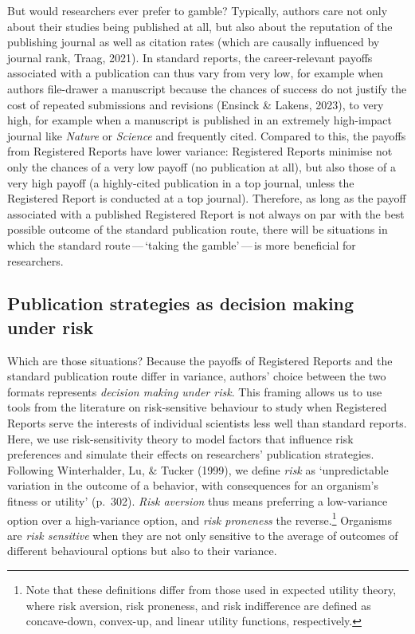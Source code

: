\documentclass[
  ,man,mask,floatsintext]{apa6}
\begin{document}
But would researchers ever prefer to gamble?
Typically, authors care not only about their studies being published at all, but also about the reputation of the publishing journal as well as citation rates (which are causally influenced by journal rank, Traag, 2021).
In standard reports, the career-relevant payoffs associated with a publication can thus vary from very low, for example when authors file-drawer a manuscript because the chances of success do not justify the cost of repeated submissions and revisions (Ensinck \& Lakens, 2023),
to very high, for example when a manuscript is published in an extremely high-impact journal like \emph{Nature} or \emph{Science} and frequently cited.
Compared to this, the payoffs from Registered Reports have lower variance:
Registered Reports minimise not only the chances of a very low payoff (no publication at all), but also those of a very high payoff (a highly-cited publication in a top journal, unless the Registered Report is conducted at a top journal).
Therefore, as long as the payoff associated with a published Registered Report is not always on par with the best possible outcome of the standard publication route,
there will be situations in which the standard route\(\,\)---\(\,\)`taking the gamble'\(\,\)---\(\,\)is more beneficial for researchers.

\hypertarget{publication-strategies-as-decision-making-under-risk}{%
\subsection{Publication strategies as decision making under risk}\label{publication-strategies-as-decision-making-under-risk}}

Which are those situations?
Because the payoffs of Registered Reports and the standard publication route differ in variance, authors' choice between the two formats represents \emph{decision making under risk}.
This framing allows us to use tools from the literature on risk-sensitive behaviour to study when Registered Reports serve the interests of individual scientists less well than standard reports.
Here, we use risk-sensitivity theory to model factors that influence risk preferences and simulate their effects on researchers' publication strategies.
Following Winterhalder, Lu, \& Tucker (1999), we define \emph{risk} as `unpredictable variation in the outcome of a behavior, with consequences for an organism's fitness or utility' (p.~302).
\emph{Risk aversion} thus means preferring a low-variance option over a high-variance option, and \emph{risk proneness} the reverse.\footnote{Note that these definitions differ from those used in expected utility theory, where risk aversion, risk proneness, and risk indifference are defined as concave-down, convex-up, and linear utility functions, respectively.}
Organisms are \emph{risk sensitive} when they are not only sensitive to the average of outcomes of different behavioural options but also to their variance.
\end{document}
